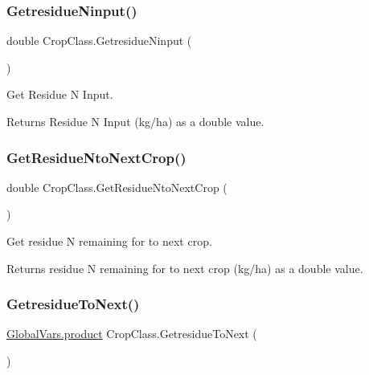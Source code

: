 \subsubsection{\texorpdfstring{GetresidueNinput()}{GetresidueNinput()}}
{\footnotesize\ttfamily double Crop\+Class.\+Getresidue\+Ninput (\begin{DoxyParamCaption}{ }\end{DoxyParamCaption})\hspace{0.3cm}{\ttfamily [inline]}}



Get Residue N Input. 

\begin{DoxyReturn}{Returns}
Residue N Input (kg/ha) as a double value. 
\end{DoxyReturn}
\mbox{\label{class_crop_class_a9f0d9ed0df4b1989041592b3d2d66f40}} 
\subsubsection{\texorpdfstring{GetResidueNtoNextCrop()}{GetResidueNtoNextCrop()}}
{\footnotesize\ttfamily double Crop\+Class.\+Get\+Residue\+Nto\+Next\+Crop (\begin{DoxyParamCaption}{ }\end{DoxyParamCaption})\hspace{0.3cm}{\ttfamily [inline]}}



Get residue N remaining for to next crop. 

\begin{DoxyReturn}{Returns}
residue N remaining for to next crop (kg/ha) as a double value. 
\end{DoxyReturn}
\mbox{\label{class_crop_class_a7c8d225daf6bd0104cea280993403ec7}} 
\subsubsection{\texorpdfstring{GetresidueToNext()}{GetresidueToNext()}}
{\footnotesize\ttfamily \mbox{\hyperlink{class_global_vars_1_1product}{Global\+Vars.\+product}} Crop\+Class.\+Getresidue\+To\+Next (\begin{DoxyParamCaption}{ }\end{DoxyParamCaption})\hspace{0.3cm}{\ttfamily [inline]}}



